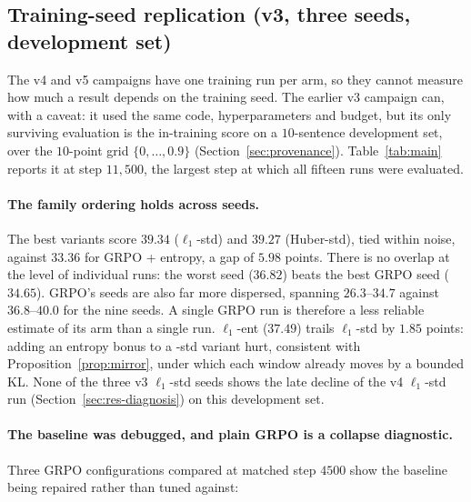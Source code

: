 \subsection{Training-seed replication (v3, three seeds, development set)}
\label{sec:seed-replication}

The v4 and v5 campaigns have one training run per arm, so they cannot measure how much a
result depends on the training seed. The earlier v3 campaign can, with a
caveat: it used the same code, hyperparameters and budget, but its only
surviving evaluation is the in-training score on a $10$-sentence development
set, over the $10$-point grid $\{0,\dots,0.9\}$ (Section~\ref{sec:provenance}).
Table~\ref{tab:main} reports it at step $11{,}500$, the largest step at which
all fifteen runs were evaluated.

\begin{table}[t]
\centering

\caption{\textbf{v3 campaign} (three training seeds per arm): mean reward,
content and sentiment at matched step $11{,}500$, on the \emph{$10$-sentence
development set} and the $10$-point $\lmb$ grid. Not comparable in absolute
terms to the v4 or v5 test-split numbers.}
\label{tab:main}
\end{table}

\paragraph{The family ordering holds across seeds.}
The best \rrebel{} variants score $39.34$ ($\ell_1$-std) and $39.27$
(Huber-std), tied within noise, against $33.36$ for GRPO + entropy, a gap of
$5.98$ points. There is no overlap at the level of individual runs: the worst
\rrebel{} seed ($36.82$) beats the best GRPO seed ($34.65$). GRPO's seeds are
also far more dispersed, spanning $26.3$--$34.7$ against $36.8$--$40.0$ for the
nine \rrebel{} seeds. A single GRPO run is therefore a less reliable estimate of
its arm than a single \rrebel{} run. $\ell_1$-ent ($37.49$) trails $\ell_1$-std
by $1.85$ points: adding an entropy bonus to a -std variant hurt, consistent
with Proposition~\ref{prop:mirror}, under which each window already moves by a
bounded KL. None of the three v3 $\ell_1$-std seeds shows the late decline of the
v4 $\ell_1$-std run (Section~\ref{sec:res-diagnosis}) on this development set.

\paragraph{The baseline was debugged, and plain GRPO is a collapse diagnostic.}
\label{sec:baseline-defense}
Three GRPO configurations compared at matched step $4500$ show the baseline
being repaired rather than tuned against:

